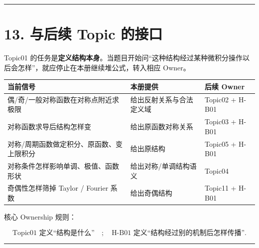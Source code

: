 \documentclass[11pt,a4paper]{ctexart}
\newcounter{none}
\begin{document}
\begin{center}\rule{0.5\linewidth}{0.5pt}\end{center}

\section{13. 与后续 Topic
的接口}\label{ux4e0eux540eux7eed-topic-ux7684ux63a5ux53e3}

Topic01
的任务是\textbf{定义结构本身}。当题目开始问``这种结构经过某种微积分操作以后会怎样''，就应停止在本册继续堆公式，转入相应
Owner。

{\def\LTcaptype{none} %
\begin{longtable}[]{@{}
  >{\raggedright\arraybackslash}p{}
  >{\raggedright\arraybackslash}p{}
  >{\raggedright\arraybackslash}p{}@{}}
\toprule\noalign{}
\begin{minipage}[b]{\linewidth}\raggedright
当前信号
\end{minipage} & \begin{minipage}[b]{\linewidth}\raggedright
本册提供
\end{minipage} & \begin{minipage}[b]{\linewidth}\raggedright
后续 Owner
\end{minipage} \\
\midrule\noalign{}
\endhead
\bottomrule\noalign{}
\endlastfoot
偶/奇/一般对称函数在对称点附近求极限 & 给出反射关系与合法定义域 &
Topic02 + H-B01 \\
对称函数求导后结构怎样变 & 给出原函数对称关系 & Topic03 + H-B01 \\
对称/周期函数做定积分、原函数、变上限积分 & 给出原结构 & Topic05 +
H-B01 \\
对称条件怎样影响单调、极值、函数形状 & 给出对称/单调结构语义 &
Topic04 \\
奇偶性怎样筛掉 Taylor / Fourier 系数 & 给出奇偶结构 & Topic11 + H-B01 \\
\end{longtable}
}

核心 Ownership 规则：

\[
\boxed{
\text{Topic01 定义“结构是什么”}
\quad;
\quad
\text{H-B01 定义“结构经过别的机制后怎样传播”}.
}
\]

\begin{center}\rule{0.5\linewidth}{0.5pt}\end{center}
\end{document}
